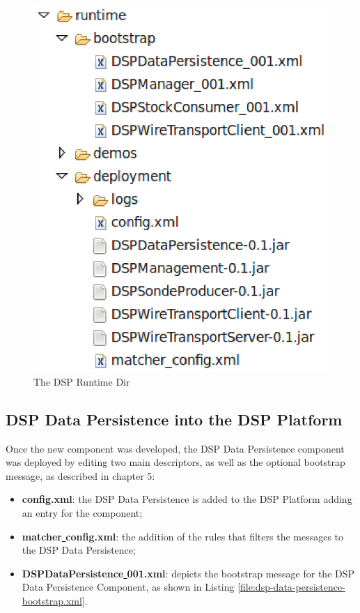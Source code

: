 \begin{figure}[!h]
  \centering
  \includegraphics[scale=0.5]{../diagrams/dsp-runtime-dir}
  \caption{The DSP Runtime Dir}
  \label{fig:dsp-runtime-dir}
\end{figure}

\subsection{DSP Data Persistence into the DSP Platform}

Once the new component was developed, the DSP Data Persistence component was
deployed by editing two main descriptors, as well as the optional bootstrap
message, as described in chapter 5:

\begin{itemize}
  \item \textbf{config.xml}: the DSP Data Persistence is added to the DSP
  Platform adding an entry for the component;
  \item \textbf{matcher\underline{ }config.xml}: the addition of the rules that
  filters the messages to the DSP Data Persistence;
  \item \textbf{DSPDataPersistence\underline{ }001.xml}: depicts the bootstrap
  message for the DSP Data Persistence Component, as shown in Listing 
  \ref{file:dsp-data-persistence-bootstrap.xml}.
\end{itemize}


